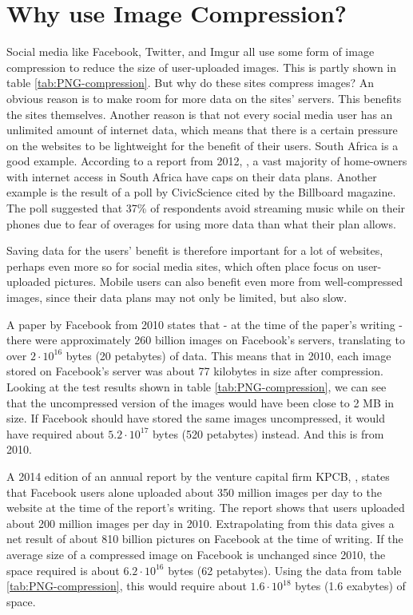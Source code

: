 \section{Why use Image Compression?}
\label{sec:whycompression}
Social media like Facebook, Twitter, and Imgur all use some form of image compression to reduce the size of user-uploaded images.
This is partly shown in table \ref{tab:PNG-compression}.
But why do these sites compress images?
An obvious reason is to make room for more data on the sites' servers.
This benefits the sites themselves.
Another reason is that not every social media user has an unlimited amount of internet data, which means that there is a certain pressure on the websites to be lightweight for the benefit of their users.
South Africa is a good example. According to a report from 2012, \citep{chetty_2012}, a vast majority of home-owners with internet access in South Africa have caps on their data plans.
Another example is the result of a poll by CivicScience \citep{tmobilemusic} cited by the Billboard magazine.
The poll suggested that 37\% of respondents avoid streaming music while on their phones due to fear of overages for using more data than what their plan allows.

Saving data for the users' benefit is therefore important for a lot of websites, perhaps even more so for social media sites, which often place focus on user-uploaded pictures.
Mobile users can also benefit even more from well-compressed images, since their data plans may not only be limited, but also slow.

A paper by Facebook from 2010 \citep{beaver2010} states that - at the time of the paper's writing - there were approximately 260 billion images on Facebook's servers, translating to over $2\cdot10^{16}$ bytes (20 petabytes) of data.
This means that in 2010, each image stored on Facebook's server was about 77 kilobytes in size after compression.
Looking at the test results shown in table \ref{tab:PNG-compression}, we can see that the uncompressed version of the images would have been close to 2 MB in size.
If Facebook should have stored the same images uncompressed, it would have required about $5.2\cdot10^{17}$ bytes (520 petabytes) instead.
And this is from 2010.

A 2014 edition of an annual report by the venture capital firm KPCB, \citep{meeker2014internet}, states that Facebook users alone uploaded about
350 million images per day to the website at the time of the report's writing.
The report shows that users uploaded about 200 million images per day in 2010.
Extrapolating from this data gives a net result of about 810 billion pictures on Facebook at the time of writing.
If the average size of a compressed image on Facebook is unchanged since 2010, the space required is about $6.2\cdot10^{16}$ bytes (62 petabytes).
Using the data from table \ref{tab:PNG-compression}, this would require about $1.6\cdot10^{18}$ bytes (1.6 exabytes) of space.


